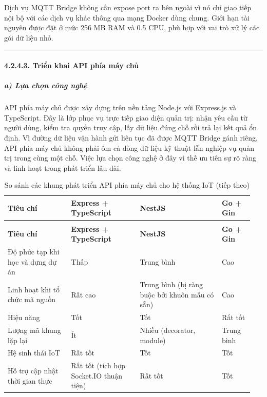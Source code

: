 \documentclass[a4paper]{extarticle}
\newcommand{\thesissettableid}[2]{%
  \renewcommand{\thetable}{#1}%
  \renewcommand{\theHtable}{#2}%
}
\begin{document}
Dịch vụ MQTT Bridge không cần expose port ra bên ngoài vì nó chỉ giao
tiếp nội bộ với các dịch vụ khác thông qua mạng Docker dùng chung.
Giới hạn tài nguyên được đặt ở mức 256 MB RAM và 0.5 CPU, phù hợp với
vai trò xử lý các gói dữ liệu nhỏ.

\begin{center}\rule{0.5\linewidth}{0.5pt}\end{center}

\paragraph{4.2.4.3. Triển khai API phía máy chủ}\label{4243-triux1ec3n-khai-backend-api-backend-api-implementation}

\subparagraph{a) Lựa chọn công
nghệ}\label{a-lux1ef1a-chux1ecdn-cuxf4ng-nghux1ec7-1}

API phía máy chủ được xây dựng trên nền tảng Node.js với Express.js và
TypeScript. Đây là lớp phục vụ trực tiếp giao diện quản trị: nhận yêu
cầu từ người dùng, kiểm tra quyền truy cập, lấy dữ liệu đúng chỗ rồi trả
lại kết quả ổn định. Vì đường dữ liệu vận hành gửi liên tục đã được MQTT
Bridge gánh riêng, API phía máy chủ không phải ôm cả dòng dữ liệu kỹ
thuật lẫn nghiệp vụ quản trị trong cùng một chỗ. Việc lựa chọn công nghệ
ở đây vì thế ưu tiên sự rõ ràng và linh hoạt trong phát triển lâu dài.


{\thesissettableid{4.6}{tab-ch4-so-sanh-framework-backend-cho-he-thong-iot}
\def\LTcaptype{table}
\begin{longtable}{|L{0.246\linewidth}|L{0.269\linewidth}|L{0.318\linewidth}|L{0.121\linewidth}|}
\caption{So sánh các khung phát triển API phía máy chủ cho hệ thống IoT}\label{tab:ch4-so-sanh-framework-backend-cho-he-thong-iot}\\
\hline \textbf{Tiêu chí} & \textbf{Express + TypeScript} & \textbf{NestJS} & \textbf{Go + Gin} \\
\hline
\endfirsthead
\caption[]{So sánh các khung phát triển API phía máy chủ cho hệ thống IoT (tiếp theo)}\\
\hline \textbf{Tiêu chí} & \textbf{Express + TypeScript} & \textbf{NestJS} & \textbf{Go + Gin} \\
\hline
\endhead
\hline
\endfoot
\endlastfoot
Độ phức tạp khi học và dựng dự án & Thấp & Trung bình & Cao \\\hline
Linh hoạt khi tổ chức mã nguồn & Rất cao & Trung bình (bị ràng buộc bởi khuôn mẫu có sẵn) & Cao \\\hline
Hiệu năng & Tốt & Tốt & Rất tốt \\\hline
Lượng mã khung lặp lại & Ít & Nhiều (decorator, module) & Trung bình \\\hline
Hệ sinh thái IoT & Rất tốt & Tốt & Tốt \\\hline
Hỗ trợ cập nhật thời gian thực & Rất tốt (tích hợp Socket.IO thuận tiện) & Rất tốt & Tốt \\\hline
\end{longtable}
}
\end{document}
